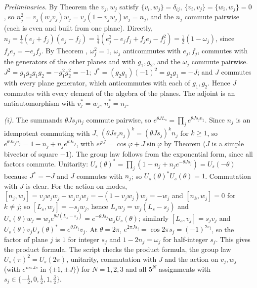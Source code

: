 \emph{Preliminaries.} By Theorem  the $v_{j}, w_{j}$ satisfy $\{v_{i}, w_{j}\} = \delta_{ij}$, $\{v_{i}, v_{j}\} = \{w_{i}, w_{j}\} = 0$, so $n_{j}^{2} = v_{j}(w_{j}v_{j})w_{j} = v_{j}(1 - v_{j}w_{j})w_{j} = n_{j}$, and the $n_{j}$ commute pairwise (each is even and built from one plane). Directly, $n_{j} = \tfrac14(e_{j} + f_{j})(e_{j} - f_{j}) = \tfrac14(e_{j}^{2} - e_{j}f_{j} + f_{j}e_{j} - f_{j}^{2}) = \tfrac12(1 - \omega_{j})$, since $f_{j}e_{j} = -e_{j}f_{j}$. By Theorem , $\omega_{j}^{2} = 1$, $\omega_{j}$ anticommutes with $e_{j}, f_{j}$, commutes with the generators of the other planes and with $g_{1}, g_{2}$, and the $\omega_{j}$ commute pairwise. $J^{2} = g_{1}g_{2}g_{1}g_{2} = -g_{1}^{2}g_{2}^{2} = -1$; $J^{*} = (g_{2}g_{1})(-1)^{2} = g_{2}g_{1} = -J$; and $J$ commutes with every plane generator, which anticommutes with each of $g_{1}, g_{2}$. Hence $J$ commutes with every element of the algebra of the planes. The adjoint is an antiautomorphism with $v_{j}^{*} = w_{j}$, $n_{j}^{*} = n_{j}$.

\emph{(i).} The summands $\theta Js_{j}n_{j}$ commute pairwise, so $e^{\theta JL_{s}} = \prod_{j}e^{\theta Js_{j}n_{j}}$. Since $n_{j}$ is an idempotent commuting with $J$, $(\theta Js_{j}n_{j})^{k} = (\theta Js_{j})^{k}n_{j}$ for $k \ge 1$, so $e^{\theta Js_{j}n_{j}} = 1 - n_{j} + n_{j}e^{\theta Js_{j}}$, with $e^{\varphi J} = \cos\varphi + J\sin\varphi$ by Theorem  ($J$ is a simple bivector of square $-1$). The group law follows from the exponential form, since all factors commute. Unitarity: $U_{s}(\theta)^{*} = \prod_{j}(1 - n_{j} + n_{j}e^{-\theta Js_{j}}) = U_{s}(-\theta)$ because $J^{*} = -J$ and $J$ commutes with $n_{j}$; so $U_{s}(\theta)^{*}U_{s}(\theta) = 1$. Commutation with $J$ is clear. For the action on modes, $[n_{j}, w_{j}] = v_{j}w_{j}w_{j} - w_{j}v_{j}w_{j} = -(1 - v_{j}w_{j})w_{j} = -w_{j}$ and $[n_{k}, w_{j}] = 0$ for $k \ne j$; so $[L_{s}, w_{j}] = -s_{j}w_{j}$, hence $L_{s}w_{j} = w_{j}(L_{s} - s_{j})$ and $U_{s}(\theta)w_{j} = w_{j}e^{\theta J(L_{s} - s_{j})} = e^{-\theta Js_{j}}w_{j}U_{s}(\theta)$; similarly $[L_{s}, v_{j}] = s_{j}v_{j}$ and $U_{s}(\theta)v_{j}U_{s}(\theta)^{*} = e^{\theta Js_{j}}v_{j}$. At $\theta = 2\pi$, $e^{2\pi Js_{j}} = \cos 2\pi s_{j} = (-1)^{2s_{j}}$, so the factor of plane $j$ is $1$ for integer $s_{j}$ and $1 - 2n_{j} = \omega_{j}$ for half-integer $s_{j}$. This gives the product formula. The script checks the product formula, the group law $U_{s}(\pi)^{2} = U_{s}(2\pi)$, unitarity, commutation with $J$ and the action on $v_{j}, w_{j}$ (with $e^{m\pi Js}$ in $\{\pm1, \pm J\}$) for $N = 1, 2, 3$ and all $5^{N}$ assignments with $s_{j} \in \{-\tfrac12, 0, \tfrac12, 1, \tfrac32\}$.


